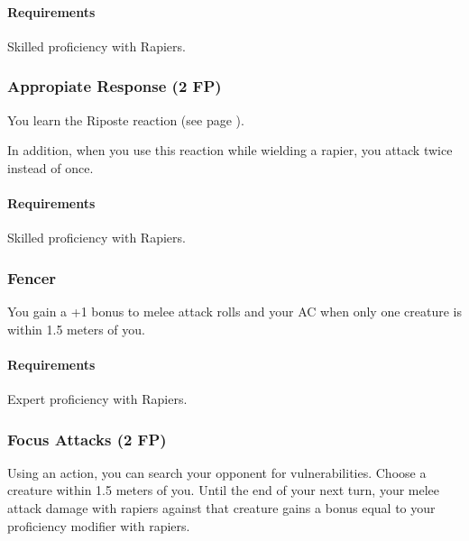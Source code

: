     \paragraph{Requirements} Skilled proficiency with Rapiers.
\subsubsection{Appropiate Response (2 FP)} \label{feat::appropiateresponse}
    You learn the Riposte reaction (see page \pageref{act::riposte}).

    In addition, when you use this reaction while wielding a rapier, you attack twice instead of once.
    \paragraph{Requirements} Skilled proficiency with Rapiers.
\subsubsection{Fencer} \label{feat::fencer}
    You gain a +1 bonus to melee attack rolls and your AC when only one creature is within 1.5 meters of you.
    \paragraph{Requirements} Expert proficiency with Rapiers.
\subsubsection{Focus Attacks (2 FP)} \label{feat::focusattacks}
    Using an action, you can search your opponent for vulnerabilities.
    Choose a creature within 1.5 meters of you.
    Until the end of your next turn, your melee attack damage with rapiers against that creature gains a bonus equal to your proficiency modifier with rapiers.
